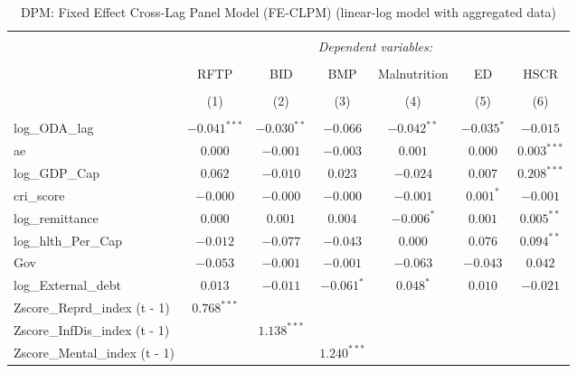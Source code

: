 \documentclass[aspectratio=169,handout, 10pt]{beamer}
\begin{document}
\begin{frame}%

  \footnotesize
\renewcommand{\arraystretch}{0.6} 
\begin{longtable}{@{\extracolsep{3pt}}lcccccc} 
\caption{DPM: Fixed Effect Cross-Lag Panel Model (FE-CLPM) (linear-log model with aggregated data)} 
\\[-2ex]\hline 
\hline \\[-1ex] 
 & \multicolumn{6}{c}{\textit{Dependent variables:}} \\ 
\cline{2-7} 
\\[-1ex] 
 & RFTP & BID  & BMP & Malnutrition & ED  & HSCR \\
\\[-1.8ex] & (1) & (2) & (3) & (4) & (5) & (6)\\ 
\hline \\[-1ex]
log\_ODA\_lag                   & $-0.041^{***}$ & $-0.030^{**}$ & $-0.066$      & $-0.042^{**}$ & $-0.035^{*}$  & $-0.015$      \\        
ae                              & $0.000$        & $-0.001$      & $-0.003$      & $0.001$       & $0.000$       & $0.003^{***}$ \\

log\_GDP\_Cap                   & $0.062$        & $-0.010$      & $0.023$       & $-0.024$      & $0.007$       & $0.208^{***}$ \\
cri\_score                      & $-0.000$       & $-0.000$      & $-0.000$      & $-0.001$      & $0.001^{*}$   & $-0.001$      \\
log\_remittance                 & $0.000$        & $0.001$       & $0.004$       & $-0.006^{*}$  & $0.001$       & $0.005^{**}$  \\
log\_hlth\_Per\_Cap             & $-0.012$       & $-0.077$      & $-0.043$      & $0.000$       & $0.076$       & $0.094^{**}$  \\
Gov                             & $-0.053$       & $-0.001$      & $-0.001$      & $-0.063$      & $-0.043$      & $0.042$       \\
log\_External\_debt             & $0.013$        & $-0.011$      & $-0.061^{*}$  & $0.048^{*}$   & $0.010$       & $-0.021$      \\
Zscore\_Reprd\_index (t - 1)    & $0.768^{***}$  &               &               &               &               &               \\
Zscore\_InfDis\_index (t - 1)   &                & $1.138^{***}$ &               &               &               &               \\
Zscore\_Mental\_index (t - 1)   &                &               & $1.240^{***}$ &               &               &               \\


\end{longtable}
\end{frame}
\end{document}
